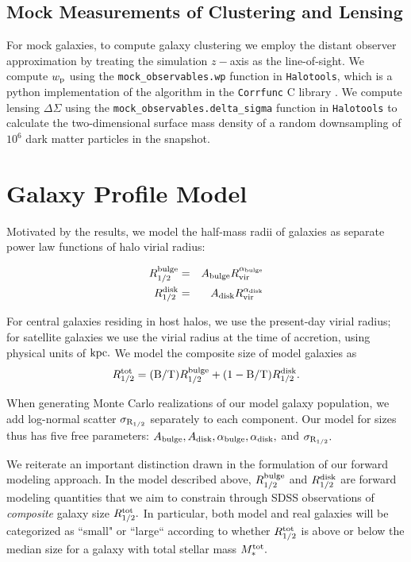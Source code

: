 \documentclass[usenatbib,usegraphicx,letterpaper]{mn2e}
\newcommand{\beq}{\begin{equation}}
\newcommand{\eeq}{\end{equation}}
\newcommand{\rhalftot}{R^{\rm tot}_{1/2}}
\newcommand{\rhalfdisk}{R_{1/2}^{\rm disk}}
\newcommand{\rhalfbulge}{R_{1/2}^{\rm bulge}}
\newcommand{\adisk}{A_{\rm disk}}
\newcommand{\abulge}{A_{\rm bulge}}
\newcommand{\alphadisk}{\alpha_{\rm disk}}
\newcommand{\alphabulge}{\alpha_{\rm bulge}}
\newcommand{\sigmarhalf}{\sigma_{\rm R_{1/2}}}
\newcommand{\rvir}{R_{\rm vir}}
\newcommand{\bt}{{\rm B/T}}
\newcommand{\mstartot}{M^{\rm tot}_{\ast}}
\newcommand{\wproj}{w_{\rm p}}
\newcommand{\kpc}{{\rm kpc}}
\begin{document}
\subsection{Mock Measurements of Clustering and Lensing}
\label{subsec:mock_measurements}

For mock galaxies, to compute galaxy clustering we employ the distant observer approximation by treating the simulation $z-$axis as the line-of-sight. We compute $\wproj$ using the {\tt mock\_observables.wp} function in {\tt Halotools}, which is a python implementation of the algorithm in the {\tt Corrfunc} C library \citep{sinha_etal17}. We compute lensing $\Delta\Sigma$ using the {\tt mock\_observables.delta\_sigma} function in {\tt Halotools} to calculate the two-dimensional surface mass density of a random downsampling of $10^6$ dark matter particles in the snapshot. 


\section{Galaxy Profile Model}
\label{sec:model}

Motivated by the \citet{kravtsov13} results, we model the half-mass radii of galaxies as separate power law functions of halo virial radius:

\begin{eqnarray}
\label{eq:fiducial_model}
\rhalfbulge &=& \abulge\rvir^{\alphabulge} \\
\rhalfdisk &=& \adisk\rvir^{\alphadisk}
\end{eqnarray}

For central galaxies residing in host halos, we use the present-day virial radius; for satellite galaxies we use the virial radius at the time of accretion, using physical units of $\kpc.$ We model the composite size of model galaxies as
\beq
\rhalftot = (\bt)\rhalfbulge + (1-\bt)\rhalfdisk.
\eeq

When generating Monte Carlo realizations of our model galaxy population, we add log-normal scatter $\sigmarhalf$ separately to each component. Our model for sizes thus has five free parameters: $\abulge, \adisk, \alphabulge, \alphadisk,$ and $\sigmarhalf.$

We reiterate an important distinction drawn in the formulation of our forward modeling approach. In the model described above, $\rhalfbulge$ and $\rhalfdisk$ are forward modeling quantities that we aim to constrain through SDSS observations of {\em composite} galaxy size $\rhalftot.$ In particular, both model and real galaxies will be categorized as ``small" or ``large`` according to whether $\rhalftot$ is above or below the median size for a galaxy with total stellar mass $\mstartot.$
\end{document}
